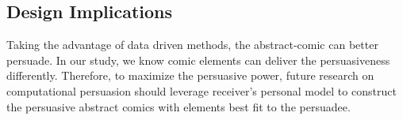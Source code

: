 \subsection{Design Implications}
Taking the advantage of data driven methods, the abstract-comic can better persuade. In our study, we know comic elements can deliver the persuasiveness differently. Therefore, to maximize the persuasive power, future research on computational persuasion should leverage receiver's personal model to construct the persuasive abstract comics with elements best fit to the persuadee.

